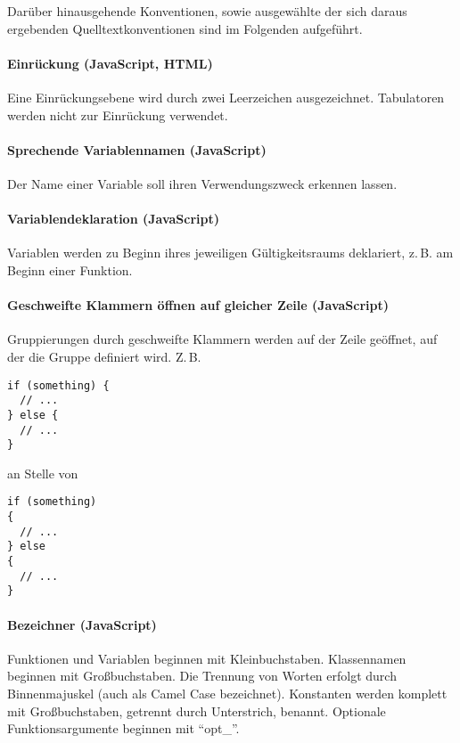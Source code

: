 Darüber hinausgehende Konventionen, sowie ausgewählte der sich daraus ergebenden Quelltextkonventionen sind im Folgenden aufgeführt.

\paragraph{Einrückung (JavaScript, HTML)}

Eine Einrückungsebene wird durch zwei Leerzeichen ausgezeichnet.
Tabulatoren werden nicht zur Einrückung verwendet.

\paragraph{Sprechende Variablennamen (JavaScript)}

Der Name einer Variable soll ihren Verwendungszweck erkennen lassen.

\paragraph{Variablendeklaration (JavaScript)}

Variablen werden zu Beginn ihres jeweiligen Gültigkeitsraums deklariert,
z.\,B. am Beginn einer Funktion.

\paragraph{Geschweifte Klammern öffnen auf gleicher Zeile (JavaScript)}

Gruppierungen durch geschweifte Klammern werden auf der Zeile
geöffnet, auf der die Gruppe definiert wird.
Z.\,B.

\begin{verbatim}
if (something) {
  // ...
} else {
  // ...
}
\end{verbatim}
an Stelle von
\begin{verbatim}
if (something) 
{
  // ...
} else 
{
  // ...
}
\end{verbatim}

\paragraph{Bezeichner (JavaScript)}

Funktionen und Variablen beginnen mit Kleinbuchstaben.
Klassennamen beginnen mit Großbuchstaben.
Die Trennung von Worten erfolgt durch Binnenmajuskel (auch als Camel
Case bezeichnet).
Konstanten werden komplett mit Großbuchstaben, getrennt durch
Unterstrich, benannt.
Optionale Funktionsargumente beginnen mit ``opt\_''.

